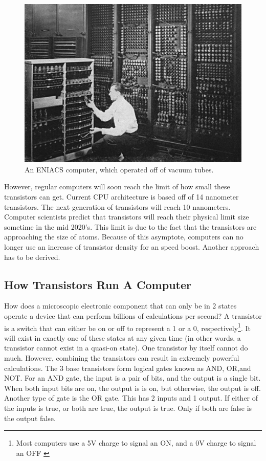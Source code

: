 \documentclass[10pt,journal,compsoc]{IEEEtran}
\begin{document}
\begin{figure}
	\centering
	\includegraphics[width=0.7\linewidth]{eniacsvacuum}
	\caption[]{An ENIACS computer, which operated off of vacuum tubes\cite{ENIACS}.}
	\label{fig:eniacsvacuum}
\end{figure}


However, regular computers will soon reach the limit of how small these transistors can get. Current CPU architecture is based off of 14 nanometer transistors. The next generation of transistors will reach 10 nanometers. \cite{Intel}
 Computer scientists predict that transistors will reach their physical limit size sometime in the mid 2020's. This limit is due to the fact that the transistors are approaching the size of atoms\cite{ARSTech}. Because of this asymptote, computers can no longer use an increase of transistor density for an speed boost. Another approach has to be derived. 


\subsection{How Transistors Run A Computer}
How does a microscopic electronic component that can only be in 2 states operate a device that can perform billions of calculations per second? A transistor is a switch that can either be on or off to represent a 1 or a 0, respectively\footnote{Most computers use a 5V charge to signal an ON, and a 0V charge to signal an OFF \cite{Surrey}
}. It will exist in exactly one of these states at any given time (in other words, a transistor cannot exist in a quasi-on state). One transistor by itself cannot do much. However, combining the transistors can result in extremely powerful calculations. The 3 base transistors form logical gates known as AND, OR,and NOT.  For an AND gate, the input is a pair of bits, and the output is a single bit. When both input bits are on, the output is is on, but otherwise, the output is off. Another type of gate is the OR gate. This has 2 inputs and 1 output. If either of the inputs is true, or both are true, the output is true. Only if both are false is the output false. 
\end{document}
